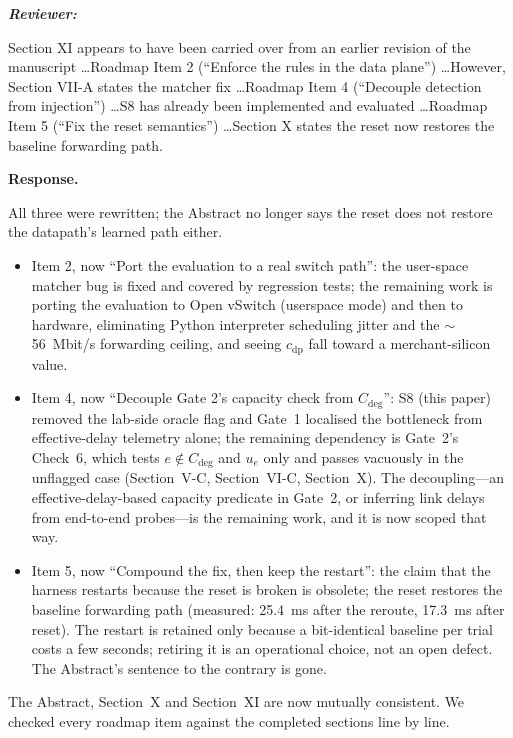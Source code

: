 \documentclass[11pt,a4paper]{article}
\newenvironment{reviewer}{\par\medskip\noindent\begin{minipage}{\linewidth}\small\itshape\color{quote}\textbf{Reviewer:}\par}{\end{minipage}\medskip\par}
\newenvironment{response}{\par\noindent\begin{minipage}{\linewidth}\small\textbf{Response.}\par}{\end{minipage}\medskip\par}
\begin{document}
\begin{reviewer}
Section XI appears to have been carried over from an earlier revision of
the manuscript \dots Roadmap Item 2 (``Enforce the rules in the data
plane'') \ldots However, Section VII-A states the matcher fix \dots Roadmap
Item 4 (``Decouple detection from injection'') \ldots S8 has already been
implemented and evaluated \ldots Roadmap Item 5 (``Fix the reset
semantics'') \ldots Section X states the reset now restores the baseline
forwarding path.
\end{reviewer}

\begin{response}
All three were rewritten; the Abstract no longer says the reset does not
restore the datapath's learned path either.

\begin{itemize}
  \item Item 2, now ``Port the evaluation to a real switch path'': the
    user-space matcher bug is fixed and covered by regression tests; the
    remaining work is porting the evaluation to Open vSwitch (userspace
    mode) and then to hardware, eliminating Python interpreter scheduling
    jitter and the $\sim$56~Mbit/s forwarding ceiling, and seeing
    $c_{\mathrm{dp}}$ fall toward a merchant-silicon value.
  \item Item 4, now ``Decouple Gate 2's capacity check from $C_{\mathrm{deg}}$'':
    S8 (this paper) removed the lab-side oracle flag and Gate~1 localised
    the bottleneck from effective-delay telemetry alone; the remaining
    dependency is Gate~2's Check~6, which tests $e\notin C_{\mathrm{deg}}$
    and $u_e$ only and passes vacuously in the unflagged case (Section~V-C,
    Section~VI-C, Section~X). The decoupling---an effective-delay-based
    capacity predicate in Gate~2, or inferring link delays from end-to-end
    probes---is the remaining work, and it is now scoped that way.
  \item Item 5, now ``Compound the fix, then keep the restart'': the claim
    that the harness restarts because the reset is broken is obsolete;
    the reset restores the baseline forwarding path (measured: 25.4~ms
    after the reroute, 17.3~ms after reset). The restart is retained only
    because a bit-identical baseline per trial costs a few seconds; retiring
    it is an operational choice, not an open defect. The Abstract's
    sentence to the contrary is gone.
\end{itemize}
The Abstract, Section~X and Section~XI are now mutually consistent. We
checked every roadmap item against the completed sections line by line.
\end{response}
\end{document}
